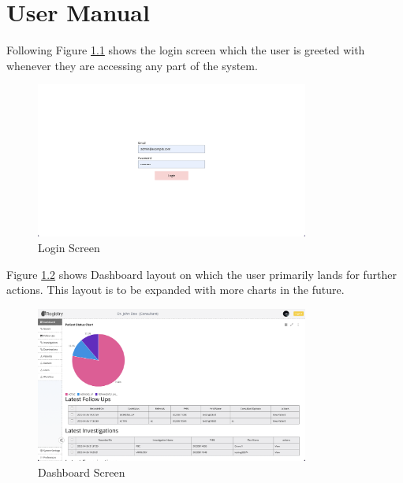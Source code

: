 \documentclass[12pt,a4paper]{report}
\begin{document}
\chapter{User Manual}

Following Figure \ref{fig:login} shows the login screen which the user is greeted with whenever they are accessing any part of the system.
\begin{figure}[hbp]
\begin{center}
\includegraphics[width=0.8\textwidth,scale=0.25]{images/login-screen.png}	
\end{center}
\caption{Login Screen}
\label{fig:login}
\end{figure}



 
Figure \ref{fig:dashboard} shows Dashboard layout on which the user primarily lands for further actions. This layout is to be expanded with more charts in the future.

\begin{figure}[hbp]
\begin{center}
\includegraphics[width=0.8\textwidth,scale=0.25]{images/dashboard.png}	
\end{center}
\caption{Dashboard Screen}
\label{fig:dashboard}
\end{figure}
\end{document}
